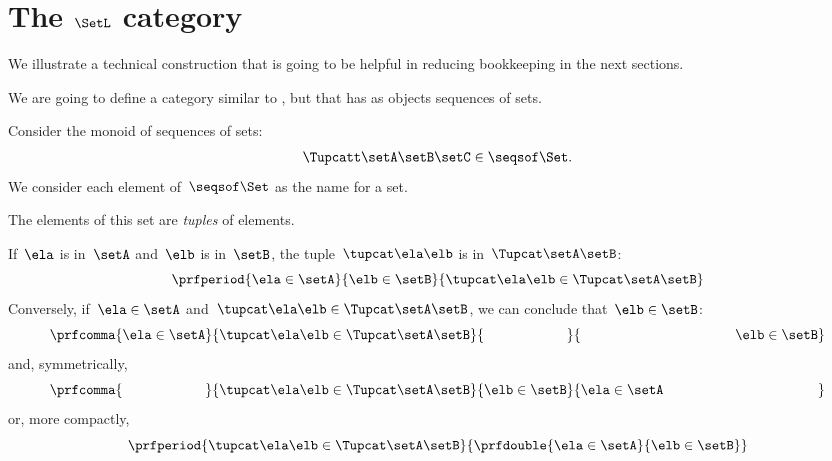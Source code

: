 \section{The $\SetL$ category}
\label{sec:SetL}

We illustrate a technical construction that is going to be helpful in reducing bookkeeping in the next sections.

We are going to define a category similar to \Set, but that has as objects sequences of sets.

Consider the monoid of sequences of sets:
%
\begin{equation}
    \label{eq:sets-monoid}
    \Tupcatt \setA  \setB  \setC \in \seqsof\Set.
\end{equation}
%
We consider each element of~$\seqsof\Set$ as the name for a set.

The elements of this set are \emph{tuples} of elements.

If~$\ela$ is in~$\setA$ and~$\elb$ is in~$\setB$, the tuple~$\tupcat \ela \elb$ is in~$\Tupcat \setA \setB$:
%
\begin{equation}
    \label{eq:sets-monoid-axiom1}
    \prfperiod{
        \ela \in \setA
    }{
        \elb \in \setB
    }{
        \tupcat \ela \elb \in \Tupcat \setA \setB
    }
\end{equation}
%
Conversely, if~$\ela \in \setA$ and~$\tupcat \ela \elb \in \Tupcat \setA \setB$, we can conclude that~$\elb \in \setB$:
%
\begin{equation}
    \label{eq:sets-monoid-axiom2}
    \prfcomma{
        \ela \in \setA
    }{
        \tupcat \ela \elb \in \Tupcat \setA  \setB
    }{
        \phantom{\elb \in \setB}
    }{
        \rule{39mm}{0pt} \elb \in  \setB
    }
\end{equation}
%
and, symmetrically,
%
\begin{equation}
    \label{eq:sets-monoid-axiom3}
    \prfcomma{
        \phantom{\ela \in \setA}
    }{
        \tupcat \ela \elb \in \Tupcat \setA \setB
    }{
        \elb \in \setB
    }{
        \ela \in  \setA \rule{39mm}{0pt}
    }
\end{equation}
%
or, more compactly,
%
\begin{equation}
    \label{eq:sets-monoid-axiom3bis}
    \prfperiod{
        \tupcat \ela \elb \in \Tupcat \setA \setB
    }{
        \prfdouble{
            \ela \in \setA
        }{
            \elb \in \setB
        }
    }
\end{equation}
%

